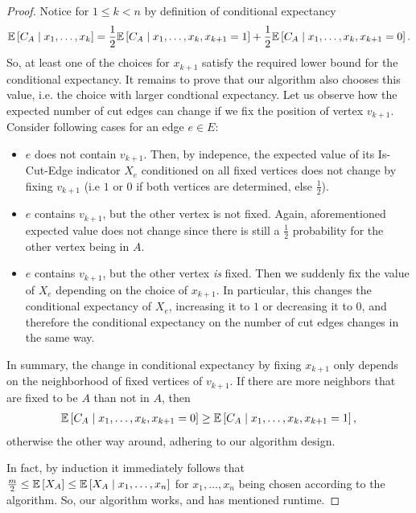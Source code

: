 \begin{proof}
    Notice for $1\leq k < n$ by definition of conditional expectancy 
    \begin{align*}
        \mathbb{E}\left[C_A \mid x_1, \dots, x_k\right] = \frac{1}{2} \mathbb{E}\left[C_A \mid x_1, \dots, x_k, x_{k+1}=1\right] + \frac{1}{2} \mathbb{E}\left[C_A \mid x_1, \dots, x_k, x_{k+1}=0\right].
    \end{align*}
    So, at least one of the choices for $x_{k+1}$ satisfy the required lower bound for the conditional expectancy.
    It remains to prove that our algorithm also chooses this value, i.e. the choice with larger condtional expectancy.
    Let us observe how the expected number of cut edges can change if we fix the position of vertex $v_{k+1}$.
    Consider following cases for an edge $e \in E$:
    \begin{itemize}
        \item $e$ does not contain $v_{k+1}$. Then, by indepence, the expected value of its Is-Cut-Edge indicator $X_e$ 
        conditioned on all fixed vertices does not change by fixing $v_{k+1}$ (i.e $1$ or $0$ if both vertices are determined, else $\frac{1}{2}$).
        \item $e$ contains $v_{k+1}$, but the other vertex is not fixed. Again, aforementioned expected value does not change since there is still a $\frac{1}{2}$
        probability for the other vertex being in $A$.
        \item $e$ contains $v_{k+1}$, but the other vertex \emph{is} fixed. Then we suddenly fix the value of $X_e$ 
        depending on the choice of $x_{k+1}$.
        In particular, this changes the conditional expectancy of $X_e$, increasing it to $1$ or decreasing it to $0$,
        and therefore the conditional expectancy on the number of cut edges changes in the same way.
    \end{itemize}
    In summary, the change in conditional expectancy by fixing $x_{k+1}$ only depends on the neighborhood of fixed vertices of $v_{k+1}$.
    If there are more neighbors that are fixed to be $A$ than not in $A$, then 
    \begin{align*}
        \mathbb{E}\left[C_A \mid x_1, \dots, x_k, x_{k+1}=0\right] \geq \mathbb{E}\left[C_A \mid x_1, \dots, x_k, x_{k+1}=1\right],
    \end{align*}
    otherwise the other way around, adhering to our algorithm design.

    In fact, by induction it immediately follows that $\frac{m}{2} \leq \mathbb{E}\left[X_A\right]\leq \mathbb{E}\left[X_A \mid x_1, \dots, x_n\right]$ for 
    $x_1, \dots, x_n$ being chosen according to the algorithm.
    So, our algorithm works, and has mentioned runtime.
\end{proof}

